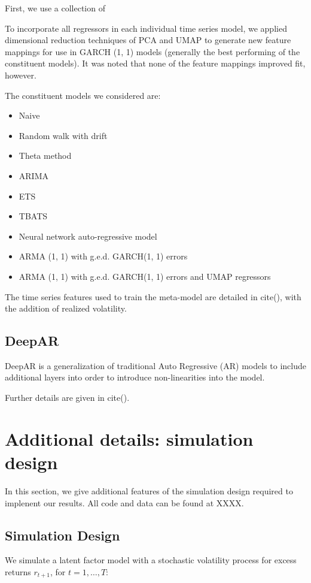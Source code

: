 \documentclass{article}
\begin{document}
First, we use a collection of 

To incorporate all regressors in each individual time series model, we applied dimensional reduction techniques of PCA and UMAP to generate new feature mappings for use in GARCH (1, 1) models (generally the best performing of the constituent models). It was noted that none of the feature mappings improved fit, however.

The constituent models we considered are:
\begin{itemize}
	\item Naive
	\item Random walk with drift
	\item Theta method
	\item ARIMA
	\item ETS
	\item TBATS
	\item Neural network auto-regressive model
	\item ARMA (1, 1) with g.e.d. GARCH(1, 1) errors
	\item ARMA (1, 1) with g.e.d. GARCH(1, 1) errors and UMAP regressors
\end{itemize}

The time series features used to train the meta-model are detailed in cite(), with the addition of realized volatility.

\subsection{DeepAR}
DeepAR is a generalization of traditional Auto Regressive (AR) models to include additional layers into order to introduce non-linearities into the model.

Further details are given in cite().

\appendix

\newpage

\section{Additional details: simulation design}
In this section, we give additional features of the simulation design required to implenent our results. All code and data can be found at XXXX. 

\subsection{Simulation Design}

We simulate a latent factor model with a stochastic volatility process for excess returns  $r_{t+1}$, for $t=1,\dots,T$:
\end{document}
